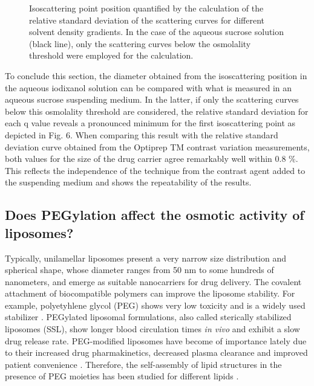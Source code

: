 \begin{figure}
	\centering
		
		\caption{Isoscattering point position quantified by the calculation of the relative standard deviation of the scattering curves for different solvent density gradients. In the case of the aqueous sucrose solution (black line), only the scattering curves below the osmolality threshold were employed for the calculation.}
		\label{fig:CaelyxIsopointComparison}
\end{figure}

To conclude this section, the diameter obtained from the isoscattering position in the aqueous iodixanol solution can be compared with what is measured in an aqueous sucrose suspending medium.  In the latter, if only the scattering curves below this osmolality threshold are considered, the relative standard deviation for each q value reveals a pronounced minimum for the first isoscattering point as depicted in Fig. 6. When comparing this result with the relative standard deviation curve obtained from the Optiprep TM contrast variation measurements, both values for the size of the drug carrier agree remarkably well within 0.8 $\%$. This reflects the independence of the technique from the contrast agent added to the suspending medium and shows the repeatability of the results.

\subsection{Does PEGylation affect the osmotic activity of liposomes?}

Typically, unilamellar liposomes present a very narrow size distribution and spherical shape, whose diameter ranges from 50 nm to some hundreds of nanometers, and emerge as suitable nanocarriers for drug delivery. The covalent attachment of biocompatible polymers can improve the liposome stability. For example, polyetyhlene glycol (PEG) shows very low toxicity \cite{yamaoka_distribution_1994} and is a widely used stabilizer \cite{sou_polyethylene_2000}. PEGylated liposomal formulations, also called sterically stabilized liposomes (SSL), show longer blood circulation times \emph{in vivo} \cite{barenholz_liposome_2001} and exhibit a slow drug release rate. PEG-modified liposomes have become of importance lately due to their increased drug pharmakinetics, decreased plasma clearance and improved patient convenience \cite{gabizon_polyethylene_1997,harris_effect_2003}. Therefore, the self-assembly of lipid structures in the presence of PEG moieties has been studied for different lipids \cite{lee_coarse-grained_2011}.


